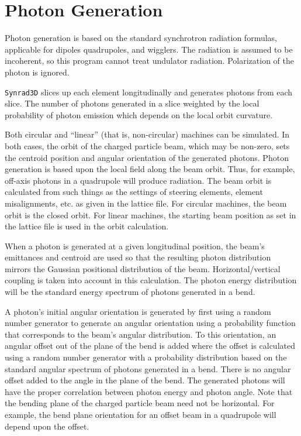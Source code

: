 \documentclass[11pt,openany]{report}
\newcommand{\srthree}{\texttt{Synrad3D}\xspace}
\begin{document}
\section{Photon Generation}

Photon generation is based on the standard synchrotron radiation
formulas, applicable for dipoles quadrupoles, and wigglers. The
radiation is assumed to be incoherent, so this program cannot treat
undulator radiation. Polarization of the photon is ignored.

\srthree slices up each element longitudinally
and generates photons from each slice. The number of photons generated
in a slice weighted by the local probability of photon emission which
depends on the local orbit curvature.

Both circular and ``linear'' (that is, non-circular) machines can be
simulated.  In both cases, the orbit of the charged particle beam,
which may be non-zero, sets the centroid position and angular
orientation of the generated photons. Photon generation is based upon
the local field along the beam orbit. Thus, for example, off-axis
photons in a quadrupole will produce radiation. The beam orbit is
calculated from such things as the settings of steering elements,
element misalignments, etc. as given in the lattice file. For circular
machines, the beam orbit is the closed orbit. For linear machines, the
starting beam position as set in the lattice file is used in the orbit
calculation.

When a photon is generated at a given longitudinal position, the
beam's emittances and centroid are used so that the resulting photon
distribution mirrors the Gaussian positional distribution of the beam.
Horizontal/vertical coupling is taken into account in this
calculation. The photon energy distribution will be the standard
energy spectrum of photons generated in a bend.

A photon's initial angular orientation is generated by first using a
random number generator to generate an angular orientation using a
probability function that corresponds to the beam's angular
distribution. To this orientation, an angular offset out of the plane
of the bend is added where the offset is calculated using a random
number generator with a probability distribution based on the standard
angular spectrum of photons generated in a bend. There is no angular
offset added to the angle in the plane of the bend. The generated
photons will have the proper correlation between photon energy and
photon angle. Note that the bending plane of the charged particle beam
need not be horizontal. For example, the bend plane orientation for an
offset beam in a quadrupole will depend upon the offset.
\end{document}
